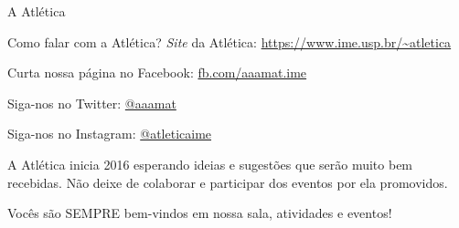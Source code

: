 \begin{secao}{A Atlética}
\begin{subsecao}{Como falar com a Atlética?}
\textit{Site} da Atlética: \url{https://www.ime.usp.br/~atletica}

Curta nossa página no Facebook: \url{fb.com/aaamat.ime}

Siga-nos no Twitter: \url{@aaamat}

Siga-nos no Instagram: \url{@atleticaime}

A Atlética inicia 2016 esperando ideias e sugestões que serão muito bem %
recebidas. Não deixe de colaborar e participar dos eventos por ela promovidos.

Vocês são SEMPRE bem-vindos em nossa sala, atividades e eventos!

\end{subsecao}
\end{secao}
